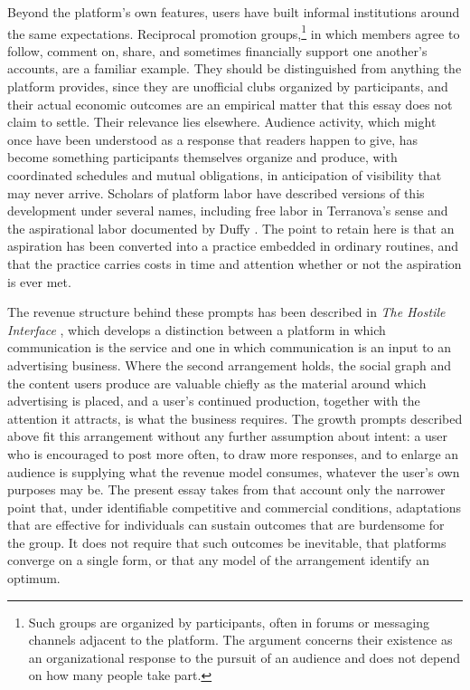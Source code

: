 \documentclass[12pt]{article}
\theoremstyle{plain}
\theoremstyle{definition}
\begin{document}
Beyond the platform's own features, users have built informal institutions around the same expectations. Reciprocal promotion groups,\footnote{Such groups are organized by participants, often in forums or messaging channels adjacent to the platform. The argument concerns their existence as an organizational response to the pursuit of an audience and does not depend on how many people take part.} in which members agree to follow, comment on, share, and sometimes financially support one another's accounts, are a familiar example. They should be distinguished from anything the platform provides, since they are unofficial clubs organized by participants, and their actual economic outcomes are an empirical matter that this essay does not claim to settle. Their relevance lies elsewhere. Audience activity, which might once have been understood as a response that readers happen to give, has become something participants themselves organize and produce, with coordinated schedules and mutual obligations, in anticipation of visibility that may never arrive. Scholars of platform labor have described versions of this development under several names, including free labor in Terranova's sense and the aspirational labor documented by Duffy \cite{terranova2000,duffy2017}. The point to retain here is that an aspiration has been converted into a practice embedded in ordinary routines, and that the practice carries costs in time and attention whether or not the aspiration is ever met.

The revenue structure behind these prompts has been described in \emph{The Hostile Interface} \cite{flyxion2026hostile}, which develops a distinction between a platform in which communication is the service and one in which communication is an input to an advertising business. Where the second arrangement holds, the social graph and the content users produce are valuable chiefly as the material around which advertising is placed, and a user's continued production, together with the attention it attracts, is what the business requires. The growth prompts described above fit this arrangement without any further assumption about intent: a user who is encouraged to post more often, to draw more responses, and to enlarge an audience is supplying what the revenue model consumes, whatever the user's own purposes may be. The present essay takes from that account only the narrower point that, under identifiable competitive and commercial conditions, adaptations that are effective for individuals can sustain outcomes that are burdensome for the group. It does not require that such outcomes be inevitable, that platforms converge on a single form, or that any model of the arrangement identify an optimum.
\end{document}
